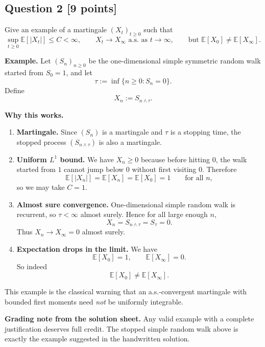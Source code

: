 \documentclass[11pt]{article}
\theoremstyle{definition}
\begin{document}
\subsection*{Question 2 \hfill [9 points]}
Give an example of a martingale \((X_t)_{t\ge 0}\) such that
\[
\sup_{t\ge 0}\mathbb E[|X_t|]\le C<\infty,
\qquad
X_t\to X_\infty \text{ a.s. as } t\to\infty,
\qquad
\text{but } \mathbb E[X_0]\ne \mathbb E[X_\infty].
\]

\textbf{Example.} Let \((S_n)_{n\ge 0}\) be the one-dimensional simple symmetric random walk started from \(S_0=1\), and let
\[
\tau:=\inf\{n\ge 0:S_n=0\}.
\]
Define
\[
X_n:=S_{n\wedge \tau}.
\]

\textbf{Why this works.}
\begin{enumerate}[label=(\roman*)]
    \item \textbf{Martingale.} Since \((S_n)\) is a martingale and \(\tau\) is a stopping time, the stopped process \((S_{n\wedge \tau})\) is also a martingale.

    \item \textbf{Uniform \(L^1\) bound.} We have \(X_n\ge 0\) because before hitting \(0\), the walk started from \(1\) cannot jump below \(0\) without first visiting \(0\). Therefore
    \[
    \mathbb E[|X_n|]=\mathbb E[X_n]=\mathbb E[X_0]=1
    \qquad \text{for all } n,
    \]
    so we may take \(C=1\).

    \item \textbf{Almost sure convergence.} One-dimensional simple random walk is recurrent, so \(\tau<\infty\) almost surely. Hence for all large enough \(n\),
    \[
    X_n=S_{n\wedge \tau}=S_\tau=0.
    \]
    Thus \(X_n\to X_\infty=0\) almost surely.

    \item \textbf{Expectation drops in the limit.} We have
    \[
    \mathbb E[X_0]=1,
    \qquad
    \mathbb E[X_\infty]=0.
    \]
    So indeed
    \[
    \mathbb E[X_0]\ne \mathbb E[X_\infty].
    \]
\end{enumerate}

This example is the classical warning that an a.s.-convergent martingale with bounded first moments need \emph{not} be uniformly integrable.

\begin{summarybox}
\textbf{Grading note from the solution sheet.} Any valid example with a complete justification deserves full credit. The stopped simple random walk above is exactly the example suggested in the handwritten solution.
\end{summarybox}
\end{document}
